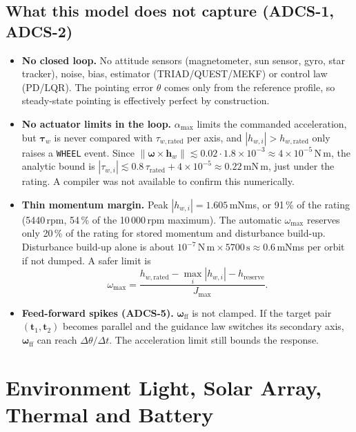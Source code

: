 \documentclass[11pt,a4paper]{article}
\newcommand{\vb}[1]{\boldsymbol{#1}}
\newcommand{\code}[1]{\texttt{#1}}
\begin{document}
\subsection{What this model does not capture (ADCS-1, ADCS-2)}
\begin{itemize}
\item \textbf{No closed loop.} No attitude sensors (magnetometer, sun sensor, gyro, star tracker), noise, bias, estimator (TRIAD/QUEST/MEKF) or control law (PD/LQR). The pointing error $\theta$ comes only from the reference profile, so steady-state pointing is effectively perfect by construction.
\item \textbf{No actuator limits in the loop.} $\alpha_{\max}$ limits the commanded acceleration, but $\vb\tau_w$ is never compared with $\tau_{w,\text{rated}}$ per axis, and $|h_{w,i}| > h_{w,\text{rated}}$ only raises a \code{WHEEL} event. Since $\lVert\vb\omega\times\vb h_w\rVert \lesssim 0.02\cdot1.8\times10^{-3} \approx 4\times10^{-5}$\,N\,m, the analytic bound is $|\tau_{w,i}| \lesssim 0.8\,\tau_{\text{rated}} + 4\times10^{-5} \approx 0.22$\,mN\,m, just under the rating. A compiler was not available to confirm this numerically.
\item \textbf{Thin momentum margin.} Peak $|h_{w,i}| = 1.605$\,mNms, or 91\,\% of the rating (5440\,rpm, 54\,\% of the 10\,000\,rpm maximum). The automatic $\omega_{\max}$ reserves only 20\,\% of the rating for stored momentum and disturbance build-up. Disturbance build-up alone is about $10^{-7}\,\mathrm{N\,m}\times5700\,\mathrm{s} \approx 0.6$\,mNms per orbit if not dumped. A safer limit is
\begin{equation}
\omega_{\max} = \frac{h_{w,\text{rated}} - \max_i|h_{w,i}| - h_{\text{reserve}}}{J_{\max}}.
\label{eq:wmax-fix}
\end{equation}
\item \textbf{Feed-forward spikes (ADCS-5).} $\vb\omega_{\text{ff}}$ is not clamped. If the target pair $(\vb t_1, \vb t_2)$ becomes parallel and the guidance law switches its secondary axis, $\vb\omega_{\text{ff}}$ can reach $\Delta\theta/\Delta t$. The acceleration limit still bounds the response.
\end{itemize}

\section{Environment Light, Solar Array, Thermal and Battery}
\end{document}
